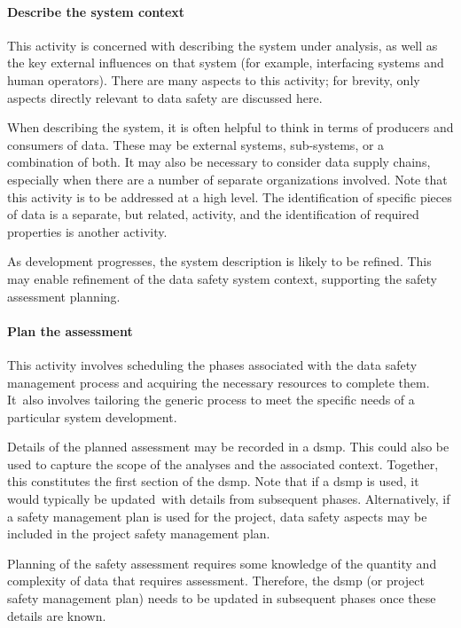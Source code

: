 \paragraph{Describe the system context}
This activity is concerned with describing the system under analysis, as well as the key external influences on that system (\cbstart for example, interfacing systems and human operators). There are many aspects to this activity; for brevity, only aspects directly relevant to data safety are discussed here\cbend.

\cbstart When describing the system, it is often helpful to think in terms of producers and consumers of data. These may be external systems, sub-systems, or a combination of both. It may also be necessary to consider data supply chains, especially when there are a number of separate organizations involved. Note that this activity is to be addressed at a high level. The identification of specific pieces of data is a separate, but related, activity, and the identification of required properties is another activity\cbend.

\cbstart As development progresses, the system description is likely to be refined. This may enable refinement of the data safety system context, supporting the \gls{safety assessment} planning.\cbend\

\paragraph{Plan the assessment}
This activity involves scheduling the phases associated with the data safety management process and acquiring the necessary resources to complete them. \cbstart It\cbend\ also involves \gls{tailoring} the generic process to meet the specific needs of a particular system development. 

Details of the planned assessment may be recorded in a \gls{dsmp}. This could also be used to capture the scope of the analyses and the associated context. Together, \cbstart this constitutes the first section of the \gls{dsmp}\cbend. Note that if a \gls{dsmp} is \cbstart used, it would typically be updated\cbend\ with details from subsequent phases. Alternatively, if a safety management plan \cbstart is used for the project, data safety aspects may be included in the project safety management plan\cbend. 

Planning of the \gls{safety assessment} requires some knowledge of the quantity and complexity of data that requires assessment. Therefore, the \gls{dsmp} (or \cbstart project safety management plan) needs to be updated in subsequent phases once these details are known.\cbend\

